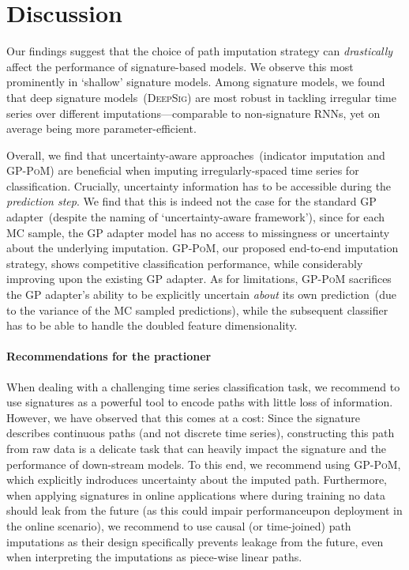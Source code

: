 \documentclass{article}
\begin{document}
\section{Discussion}

Our findings suggest that the choice of path imputation strategy can
\emph{drastically} affect the performance of signature-based models. We
observe this most prominently in `shallow' signature models. Among
signature models, we found that deep signature models~(\textsc{DeepSig})
are most robust in tackling irregular time series over different
imputations---comparable to non-signature RNNs, yet on average being
more parameter-efficient.

Overall, we find that uncertainty-aware approaches~(indicator
imputation and \textsc{GP-PoM}) are beneficial when imputing
irregularly-spaced time series for classification.
%
Crucially, uncertainty information has to be accessible during the
\emph{prediction step}. We find that this is indeed not the case for
the standard GP adapter~(despite the naming of `uncertainty-aware
framework'), since for each MC sample, the GP adapter model has no access
to missingness or uncertainty about the underlying imputation.
\textsc{GP-PoM}, our proposed end-to-end imputation strategy, shows
competitive classification performance, while considerably improving
upon the existing GP adapter. As for
limitations, \textsc{GP-PoM} sacrifices the GP adapter's ability to be
explicitly uncertain \emph{about} its own prediction~(due to the
variance of the MC sampled predictions), while the subsequent classifier
has to be able to handle the doubled feature dimensionality.

\paragraph{Recommendations for the practioner}
When dealing with a challenging time series classification task, we recommend to use signatures as a powerful tool to encode paths with little loss of information. However, we have observed that this comes at a cost: Since the signature describes continuous paths (and not discrete time series), constructing this path from raw data is a delicate task that can heavily impact the signature and the performance of down-stream models. To this end, we recommend using \textsc{GP-PoM}, which explicitly indroduces uncertainty about the imputed path. 
Furthermore, when applying signatures in online applications where during training no data should leak from the future (as this could impair performanceupon deployment in the online scenario), we recommend to use causal (or time-joined) path imputations as their design specifically prevents leakage from the future, even when interpreting the imputations as piece-wise linear paths. 
\end{document}
